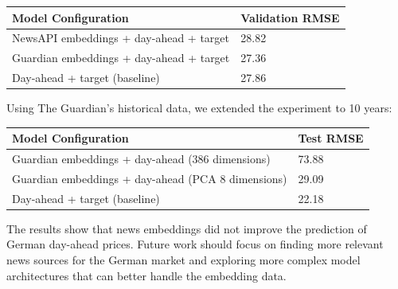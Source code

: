 \documentclass[a4paper]{article}
\begin{document}
{\fontsize{8pt}{10pt}\selectfont\begin{longtable}[]{@{}ll@{}}
\toprule\noalign{}
Model Configuration & Validation RMSE \\
\midrule\noalign{}
\endhead
\bottomrule\noalign{}
\endlastfoot
NewsAPI embeddings + day-ahead + target & 28.82 \\
Guardian embeddings + day-ahead + target & 27.36 \\
Day-ahead + target (baseline) & 27.86 \\
\end{longtable}}

Using The Guardian's historical data, we extended the experiment to 10
years:

{\fontsize{8pt}{10pt}\selectfont\begin{longtable}[]{@{}ll@{}}
\toprule\noalign{}
Model Configuration & Test RMSE \\
\midrule\noalign{}
\endhead
\bottomrule\noalign{}
\endlastfoot
Guardian embeddings + day-ahead (386 dimensions) & 73.88 \\
Guardian embeddings + day-ahead (PCA 8 dimensions) & 29.09 \\
Day-ahead + target (baseline) & 22.18 \\
\end{longtable}}

The results show that news embeddings did not improve the prediction of
German day-ahead prices. Future work should focus on finding more
relevant news sources for the German market and exploring more complex
model architectures that can better handle the embedding data.
\end{document}
